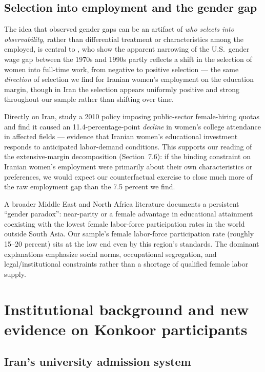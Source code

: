 \documentclass[11pt]{article}
\begin{document}
\subsection{Selection into employment and the gender gap}

The idea that observed gender gaps can be an artifact of \emph{who selects into observability}, rather than differential treatment or characteristics among the employed, is central to \citet{mulligan2008}, who show the apparent narrowing of the U.S.\ gender wage gap between the 1970s and 1990s partly reflects a shift in the selection of women into full-time work, from negative to positive selection --- the same \emph{direction} of selection we find for Iranian women's employment on the education margin, though in Iran the selection appears uniformly positive and strong throughout our sample rather than shifting over time.

Directly on Iran, \citet{tanaka2023} study a 2010 policy imposing public-sector female-hiring quotas and find it caused an 11.4-percentage-point \emph{decline} in women's college attendance in affected fields --- evidence that Iranian women's educational investment responds to anticipated labor-demand conditions. This supports our reading of the extensive-margin decomposition (Section~7.6): if the binding constraint on Iranian women's employment were primarily about their own characteristics or preferences, we would expect our counterfactual exercise to close much more of the raw employment gap than the 7.5 percent we find.

A broader Middle East and North Africa literature documents a persistent ``gender paradox'': near-parity or a female advantage in educational attainment coexisting with the lowest female labor-force participation rates in the world outside South Asia. Our sample's female labor-force participation rate (roughly 15--20 percent) sits at the low end even by this region's standards. The dominant explanations emphasize social norms, occupational segregation, and legal/institutional constraints rather than a shortage of qualified female labor supply.

\section{Institutional background and new evidence on Konkoor participants}

\subsection{Iran's university admission system}
\end{document}
